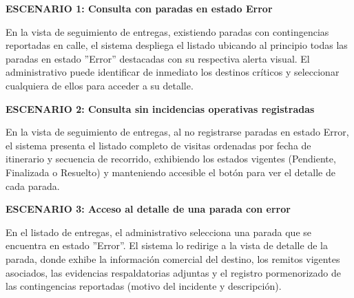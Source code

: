 \documentclass[a4paper,9pt]{article}
\begin{document}
\begin{tcolorbox}[hucard, title={\textbf{HU-17: CONSULTAR ENTREGAS CON PROBLEMAS} \hfill \scriptsize \colorbox{tealstatus}{\textbf{\ Accepted\ }} \quad \colorbox{white}{\textcolor{primarydark}{\textbf{\ 2 pts\ }}}}]
{\noindent\textbf{\textcolor{secondarydark}{ESCENARIO 1:  Consulta con paradas en estado Error}}\par\vspace{1pt}
En la vista de seguimiento de entregas, existiendo paradas con contingencias reportadas en calle, el sistema despliega el listado ubicando al principio todas las paradas en estado ''Error'' destacadas con su respectiva alerta visual. El administrativo puede identificar de inmediato los destinos críticos y seleccionar cualquiera de ellos para acceder a su detalle.\par\vspace{2.5pt}
\noindent\textbf{\textcolor{secondarydark}{ESCENARIO 2:  Consulta sin incidencias operativas registradas}}\par\vspace{1pt}
En la vista de seguimiento de entregas, al no registrarse paradas en estado Error, el sistema presenta el listado completo de visitas ordenadas por fecha de itinerario y secuencia de recorrido, exhibiendo los estados vigentes (Pendiente, Finalizada o Resuelto) y manteniendo accesible el botón para ver el detalle de cada parada.\par\vspace{2.5pt}
\noindent\textbf{\textcolor{secondarydark}{ESCENARIO 3:  Acceso al detalle de una parada con error}}\par\vspace{1pt}
En el listado de entregas, el administrativo selecciona una parada que se encuentra en estado ''Error''. El sistema lo redirige a la vista de detalle de la parada, donde exhibe la información comercial del destino, los remitos vigentes asociados, las evidencias respaldatorias adjuntas y el registro pormenorizado de las contingencias reportadas (motivo del incidente y descripción).\par\vspace{2.5pt}
}\par
\end{tcolorbox}
\end{document}
